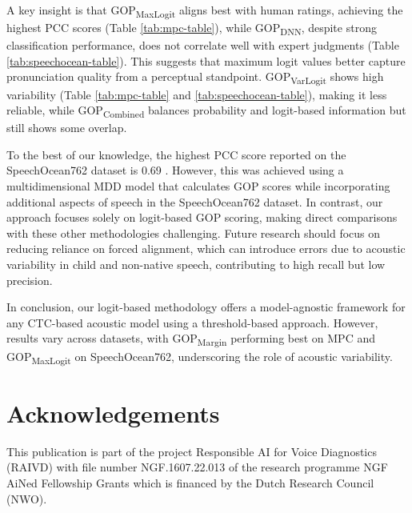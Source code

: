\documentclass{Interspeech}
\begin{document}
A key insight is that GOP\textsubscript{MaxLogit} aligns best with human ratings, achieving the highest PCC scores (Table \ref{tab:mpc-table}), while GOP\textsubscript{DNN}, despite strong classification performance, does not correlate well with expert judgments (Table \ref{tab:speechocean-table}). This suggests that maximum logit values better capture pronunciation quality from a perceptual standpoint. GOP\textsubscript{VarLogit} shows high variability (Table \ref{tab:mpc-table} and \ref{tab:speechocean-table}), making it less reliable, while GOP\textsubscript{Combined} balances probability and logit-based information but still shows some overlap. 

To the best of our knowledge, the highest PCC score reported on the SpeechOcean762 dataset is 0.69 \cite{chao23_interspeech}. However, this was achieved using a multidimensional MDD model that calculates GOP scores while incorporating additional aspects of speech in the SpeechOcean762 dataset. In contrast, our approach focuses solely on logit-based GOP scoring, making direct comparisons with these other methodologies challenging. Future research should focus on reducing reliance on forced alignment, which can introduce errors due to acoustic variability in child and non-native speech, contributing to high recall but low precision. 

In conclusion, our logit-based methodology offers a model-agnostic framework for any CTC-based acoustic model using a threshold-based approach. However, results vary across datasets, with GOP\textsubscript{Margin} performing best on MPC and GOP\textsubscript{MaxLogit} on SpeechOcean762, underscoring the role of acoustic variability.







\section{Acknowledgements}
This publication is part of the project Responsible AI for Voice Diagnostics (RAIVD) with file number NGF.1607.22.013 of the research programme NGF AiNed Fellowship Grants which is financed by the Dutch Research Council (NWO).






\end{document}
